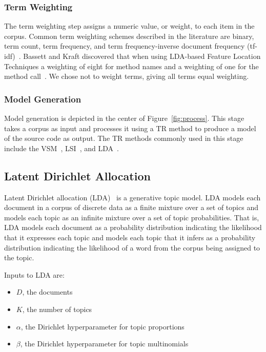     \subsubsection{Term Weighting}
    The term weighting step assigns a numeric value, or weight, to each item in the corpus.
    Common term weighting schemes described in the literature are
    binary, term count, term frequency, and
    term frequency-inverse document frequency (tf-idf)~\cite{Salton:1988}.
    Bassett and Kraft discovered that when using LDA-based Feature Location Techniques a weighting of eight for method names and a weighting of one for the method call~\cite{Bassett-Kraft:2013}.
    We chose not to weight terms, giving all terms equal weighting.

    \subsubsection{Model Generation}
    Model generation is depicted in the center of Figure~\ref{fig:process}.
    This stage takes a corpus as input and processes it using a TR method
    to produce a model of the source code as output.
    The TR methods commonly used in this stage include the VSM~\cite{Salton:1971},
    LSI~\cite{Deerwester-etal:1990},
    and LDA~\cite{Blei-etal:2003}.


\subsection{Latent Dirichlet Allocation}

Latent Dirichlet allocation (LDA)~\cite{Blei-etal:2003} is a generative topic model.
LDA models each document in a corpus of discrete data as a finite mixture over a set of topics
and models each topic as an infinite mixture over a set of topic probabilities.
That is, LDA models each document as a probability distribution
indicating the likelihood that it expresses each topic and
models each topic that it infers as a probability distribution
indicating the likelihood of a word from the corpus being assigned to the topic.

Inputs to LDA are:
\begin{itemize}
\setlength{\itemsep}{1pt}
\item $D$, the documents
\item $K$, the number of topics
\item $\alpha$, the Dirichlet hyperparameter for topic proportions
\item $\beta$, the Dirichlet hyperparameter for topic multinomials
\end{itemize}

